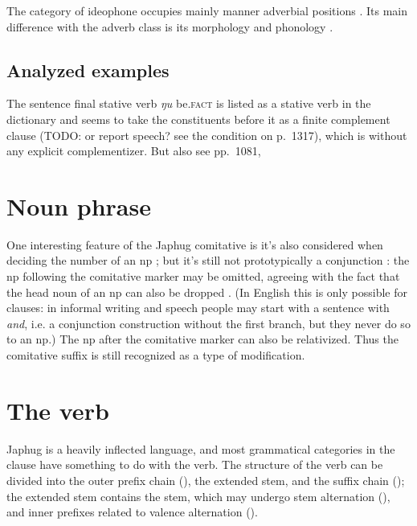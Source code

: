 \documentclass[a4paper, oneside, 12pt]{report}
\newcommand*{\citesec}[1]{\S~{#1}}
\newcommand*{\citechap}[1]{Ch~{#1}}
\newcommand*{\citetable}[1]{Table~{#1}}
\newcommand*{\citepage}[1]{p.~{#1}}
\newcommand*{\citepages}[1]{pp.~{#1}}
\newcommand{\form}[1]{\emph{#1}}
\newcommand{\category}[1]{\textsc{#1}}
\begin{document}
The category of ideophone occupies mainly manner adverbial positions
\citep[\citesec{10.1.7}]{jacques2021grammar}.
Its main difference with the adverb class 
is its morphology \citep[\citesec{10.1.2}]{jacques2021grammar}
and phonology \citep[\citesec{10.1.5}]{jacques2021grammar}.

\section{Analyzed examples}


The sentence final stative verb \form{ŋu} be.\category{fact} is 
listed as a stative verb in the dictionary
and seems to take the constituents before it 
as a finite complement clause (TODO: or report speech? see the condition on \citepage{1317}),
which is without any explicit complementizer. 
But also see \citepages{1081, }

\chapter{Noun phrase}

One interesting feature of the Japhug comitative 
is it's also considered when deciding the number of an \acs{np}
\citep[\citepage{332}]{jacques2021grammar};
but it's still not prototypically a conjunction \citep[\citepage{420}]{jacques2021grammar}:
the \acs{np} following the comitative marker 
may be omitted, 
agreeing with the fact 
that the head noun of an \acs{np}
can also be dropped \citep[\citepage{425}]{jacques2021grammar}.
(In English this is only possible for clauses:
in informal writing and speech people may start with a sentence with \form{and},
i.e. a conjunction construction 
without the first branch,
but they never do so to an \acs{np}.)
The \acs{np} after the comitative marker can also be relativized.
Thus the comitative suffix is still recognized as a type of 
modification.

\chapter{The verb}

Japhug is a heavily inflected language, 
and most grammatical categories in the clause 
have something to do with the verb.
The structure of the verb can be divided into 
the outer prefix chain (\citealt[\citetable{11.1}]{jacques2021grammar}),
the extended stem, 
and the suffix chain (\citealt[\citesec{11.3}]{jacques2021grammar});
the extended stem contains the stem, 
which may undergo stem alternation (\citealt[\citechap{12}]{jacques2021grammar}),
and inner prefixes related to valence alternation
(\citealt[\citesec{11.2.2}]{jacques2021grammar}).
\end{document}
